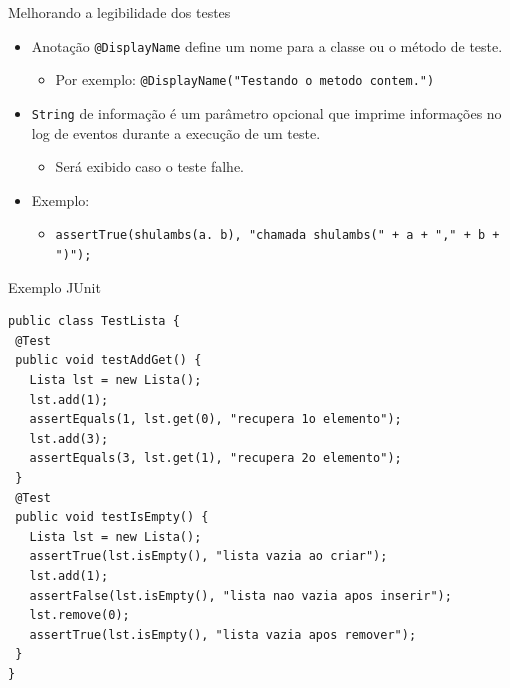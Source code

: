 \documentclass[handout]{beamer}
\begin{document}
\begin{frame}{Melhorando a legibilidade dos testes}
\begin{itemize}
\item Anotação \lstinline|@DisplayName| define um nome para a classe ou o método de teste.
\begin{itemize}
\item Por exemplo: \lstinline|@DisplayName("Testando o metodo contem.")|
\end{itemize}

\item \lstinline|String| de informação é um parâmetro opcional que imprime informações no log de eventos durante a execução de um teste.
\begin{itemize}
  \item Será exibido caso o teste falhe.
\end{itemize}

\item Exemplo:

\begin{itemize}
\item \lstinline|assertTrue(shulambs(a. b), "chamada shulambs(" + a + "," + b + ")");|
\end{itemize}
\end{itemize}
\end{frame}



\begin{frame}[fragile]{Exemplo JUnit}

\begin{lstlisting}[basicstyle=\scriptsize]
public class TestLista {
 @Test
 public void testAddGet() {
   Lista lst = new Lista();
   lst.add(1);
   assertEquals(1, lst.get(0), "recupera 1o elemento");
   lst.add(3);
   assertEquals(3, lst.get(1), "recupera 2o elemento");
 }
 @Test
 public void testIsEmpty() {
   Lista lst = new Lista();
   assertTrue(lst.isEmpty(), "lista vazia ao criar");
   lst.add(1);
   assertFalse(lst.isEmpty(), "lista nao vazia apos inserir");
   lst.remove(0);
   assertTrue(lst.isEmpty(), "lista vazia apos remover");
 }
}
\end{lstlisting}
\end{frame}
\end{document}
